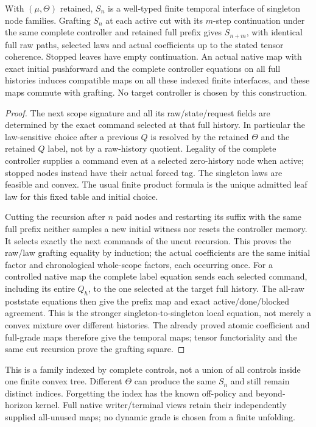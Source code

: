 \documentclass[11pt]{article}\usepackage{amsmath,amssymb,amsthm,geometry}\geometry{margin=1in}
\begin{document}
\begin{theorem}
With $(\mu,\Theta)$ retained, $S_n$ is a well-typed finite temporal interface of singleton node families. Grafting $S_n$ at each active cut with its $m$-step continuation under the same complete controller and retained full prefix gives $S_{n+m}$, with identical full raw paths, selected laws and actual coefficients up to the stated tensor coherence. Stopped leaves have empty continuation. An actual native map with exact initial pushforward and the complete controller equations on all full histories induces compatible maps on all these indexed finite interfaces, and these maps commute with grafting. No target controller is chosen by this construction.
\end{theorem}
\begin{proof}
The next scope signature and all its raw/state/request fields are determined by the exact command selected at that full history. In particular the law-sensitive choice after a previous $Q$ is resolved by the retained $\Theta$ and the retained $Q$ label, not by a raw-history quotient. Legality of the complete controller supplies a command even at a selected zero-history node when active; stopped nodes instead have their actual forced tag. The singleton laws are feasible and convex. The usual finite product formula is the unique admitted leaf law for this fixed table and initial choice.

Cutting the recursion after $n$ paid nodes and restarting its suffix with the same full prefix neither samples a new initial witness nor resets the controller memory. It selects exactly the next commands of the uncut recursion. This proves the raw/law grafting equality by induction; the actual coefficients are the same initial factor and chronological whole-scope factors, each occurring once. For a controlled native map the complete label equation sends each selected command, including its entire $Q_h$, to the one selected at the target full history. The all-raw poststate equations then give the prefix map and exact active/done/blocked agreement. This is the stronger singleton-to-singleton local equation, not merely a convex mixture over different histories. The already proved atomic coefficient and full-grade maps therefore give the temporal maps; tensor functoriality and the same cut recursion prove the grafting square.\end{proof}

This is a family indexed by complete controls, not a union of all controls inside one finite convex tree. Different $\Theta$ can produce the same $S_n$ and still remain distinct indices. Forgetting the index has the known off-policy and beyond-horizon kernel. Full native writer/terminal views retain their independently supplied all-unused maps; no dynamic grade is chosen from a finite unfolding.
\end{document}
